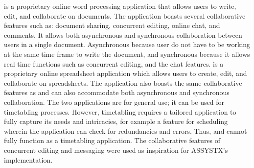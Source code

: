 \citep{googleDocs} is a proprietary online word processing application that allows users to write, edit, and collaborate on documents. The application boasts several collaborative features such as: document sharing, concurrent editing, online chat, and comments. It allows both asynchronous and synchronous collaboration between users in a single document. Asynchronous because user do not have to be working at the same time frame to write the document, and synchronous because it allows real time functions such as concurrent editing, and the chat features. \cite{googleSheets} is a proprietary online spreadsheet application which allows users to create, edit, and collaborate on spreadsheets. The application also boasts the same collaborative features as \cite{googleDocs} and can also accommodate both asynchronous and synchronous collaboration. The two applications are for general use; it can be used for timetabling processes. However, timetabling requires a tailored application to fully capture its needs and intricacies, for example a feature for scheduling wherein the application can check for redundancies and errors. Thus, \cite{googleDocs} and \cite{googleSheets} cannot fully function as a timetabling application. The collaborative features of concurrent editing and messaging were used as inspiration for ASSYSTX's implementation. 



